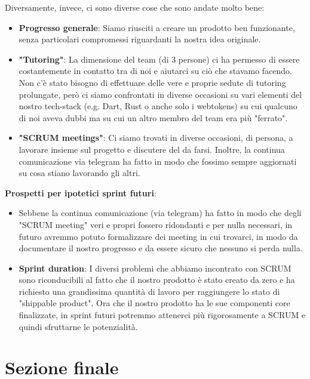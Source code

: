 \documentclass{article}
\begin{document}
Diversamente, invece, ci sono diverse cose che sono andate molto bene:
\begin{itemize}
    \item \textbf{Progresso generale}: Siamo riusciti a creare un prodotto ben funzionante, senza particolari compromessi riguardanti la nostra idea originale. 
    \item \textbf{"Tutoring"}: La dimensione del team (di 3 persone) ci ha permesso di essere costantemente in contatto tra di noi e aiutarci su ciò che stavamo facendo. Non c'è stato bisogno di effettuare delle vere e proprie sedute di tutoring prolungate, però ci siamo confrontati in diverse occasioni su vari elementi del nostro tech-stack (e.g. Dart, Rust o anche solo i webtokens) su cui qualcuno di noi aveva dubbi ma su cui un altro membro del team era più "ferrato".
    \item \textbf{"SCRUM meetings"}: Ci siamo trovati in diverse occasioni, di persona, a lavorare insieme sul progetto e discutere del da farsi. Inoltre, la continua comunicazione via telegram ha fatto in modo che fossimo sempre aggiornati su cosa stiano lavorando gli altri.
\end{itemize}

\textbf{Prospetti per ipotetici sprint futuri}:
\begin{itemize}
    \item Sebbene la continua comunicazione (via telegram) ha fatto in modo che degli "SCRUM meeting" veri e propri fossero ridondanti e per nulla necessari, in futuro avremmo potuto formalizzare dei meeting in cui trovarci, in modo da documentare il nostro progresso e da essere sicuro che nessuno si perda nulla. 
    \item \textbf{Sprint duration}: I diversi problemi che abbiamo incontrato con SCRUM sono riconducibili al fatto che il nostro prodotto è stato creato da zero e ha richiesto una grandissima quantità di lavoro per raggiungere lo stato di "shippable product". Ora che il nostro prodotto ha le sue componenti core finalizzate, in sprint futuri potremmo attenerci più rigorosamente a SCRUM e quindi sfruttarne le potenzialità.
\end{itemize}

\clearpage

\section{Sezione finale}
\end{document}
